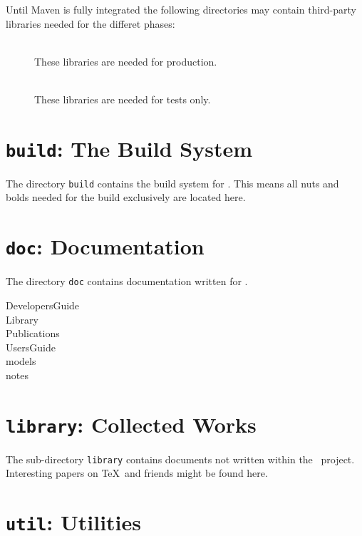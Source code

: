 Until Maven is fully integrated the following directories may contain
third-party libraries needed for the differet phases:



\begin{description}
\item[] \ \\
  These libraries are needed for production.
\item[] \ \\
  These libraries are needed for tests only.
\end{description}


\section{\texttt{build}: The Build System}

The directory \texttt{build} contains the build system for \ExTeX.
This means all nuts and bolds needed for the build exclusively are
located here.


\section{\texttt{doc}: Documentation}

The directory \texttt{doc} contains documentation written for \ExTeX.

\begin{description}
\item[DevelopersGuide] 
\item[Library] 
\item[Publications] 
\item[UsersGuide] 
\item[models] 
\item[notes] 
\end{description}


\section{\texttt{library}: Collected Works}

The sub-directory \texttt{library} contains documents not written
within the \ExTeX\ project. Interesting papers on \TeX\ and friends
might be found here.



\section{\texttt{util}: Utilities}

